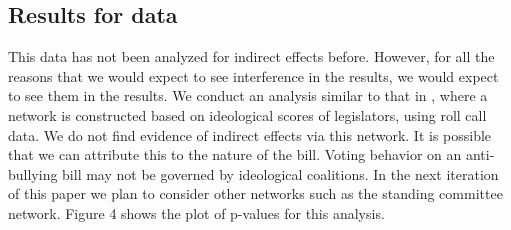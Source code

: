 \documentclass[12pt]{article}
\begin{document}


\subsection{Results for \citet{bergan2015call} data}

This data has not been analyzed for indirect effects before. However, for all the reasons that we would expect to see interference in the \citet{butler2011can} results, we would expect to see them in the \citet{bergan2015call} results. We conduct an analysis similar to that in \citet{coppock2014information}, where a network is constructed based on ideological scores of legislators, using roll call data. We do not find evidence of indirect effects via this network. It is possible that we can attribute this to the nature of the bill.  Voting behavior on an anti-bullying bill may not be governed by ideological coalitions. In the next iteration of this paper we plan to consider other networks such as the standing committee network. Figure 4 shows the plot of p-values for this analysis.
\end{document}
